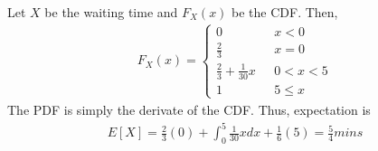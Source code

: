 \documentclass[../../probability-notes.tex]{subfile}
\begin{document}
        Let $X$ be the waiting time and $F_{X}(x)$ be the CDF. Then,
        \begin{align*}
            F_{X}(x) = \begin{cases} 0 &\mbox{ $x < 0$}\\
                                    \frac{2}{3} &\mbox{ $x = 0$}\\
                                    \frac{2}{3} + \frac{1}{30}x &\mbox{ $0 < x < 5$}\\
                                    1 &\mbox{ $5 \leq x$} \end{cases}
        \end{align*}
        The PDF is simply the derivate of the CDF. Thus, expectation is
        \begin{align*}
            E[X] = \frac{2}{3}(0) + \int_{0}^{5} \frac{1}{30}x dx + \frac{1}{6}(5) = \frac{5}{4} mins
        \end{align*}
\end{document}
